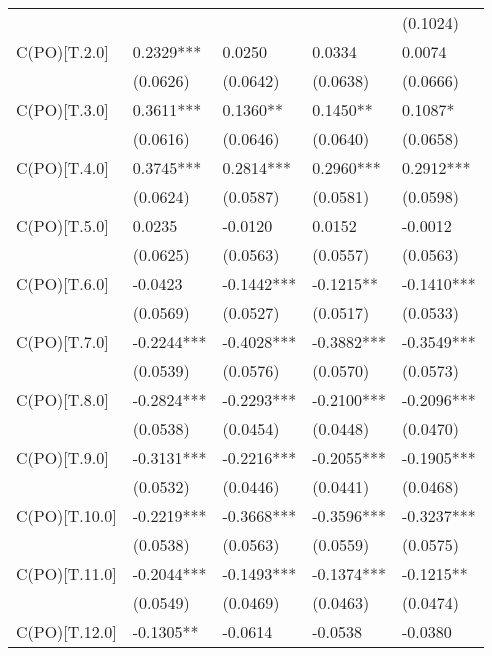 \begin{table}
\begin{center}
\begin{tabular}{lllll}
                         &            &            &            & (0.1024)    \\
C(PO)[T.2.0]             & 0.2329***  & 0.0250     & 0.0334     & 0.0074      \\
                         & (0.0626)   & (0.0642)   & (0.0638)   & (0.0666)    \\
C(PO)[T.3.0]             & 0.3611***  & 0.1360**   & 0.1450**   & 0.1087*     \\
                         & (0.0616)   & (0.0646)   & (0.0640)   & (0.0658)    \\
C(PO)[T.4.0]             & 0.3745***  & 0.2814***  & 0.2960***  & 0.2912***   \\
                         & (0.0624)   & (0.0587)   & (0.0581)   & (0.0598)    \\
C(PO)[T.5.0]             & 0.0235     & -0.0120    & 0.0152     & -0.0012     \\
                         & (0.0625)   & (0.0563)   & (0.0557)   & (0.0563)    \\
C(PO)[T.6.0]             & -0.0423    & -0.1442*** & -0.1215**  & -0.1410***  \\
                         & (0.0569)   & (0.0527)   & (0.0517)   & (0.0533)    \\
C(PO)[T.7.0]             & -0.2244*** & -0.4028*** & -0.3882*** & -0.3549***  \\
                         & (0.0539)   & (0.0576)   & (0.0570)   & (0.0573)    \\
C(PO)[T.8.0]             & -0.2824*** & -0.2293*** & -0.2100*** & -0.2096***  \\
                         & (0.0538)   & (0.0454)   & (0.0448)   & (0.0470)    \\
C(PO)[T.9.0]             & -0.3131*** & -0.2216*** & -0.2055*** & -0.1905***  \\
                         & (0.0532)   & (0.0446)   & (0.0441)   & (0.0468)    \\
C(PO)[T.10.0]            & -0.2219*** & -0.3668*** & -0.3596*** & -0.3237***  \\
                         & (0.0538)   & (0.0563)   & (0.0559)   & (0.0575)    \\
C(PO)[T.11.0]            & -0.2044*** & -0.1493*** & -0.1374*** & -0.1215**   \\
                         & (0.0549)   & (0.0469)   & (0.0463)   & (0.0474)    \\
C(PO)[T.12.0]            & -0.1305**  & -0.0614    & -0.0538    & -0.0380     \\

\end{tabular}
\end{center}
\end{table}
